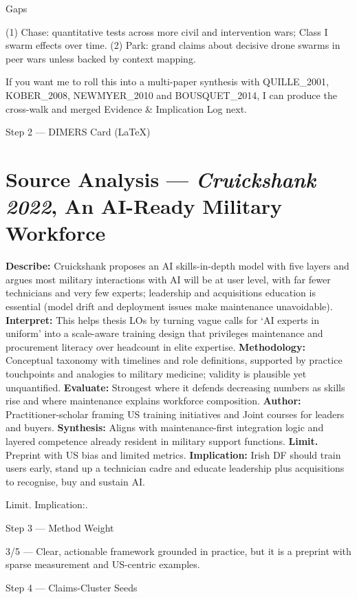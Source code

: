 Gaps

(1) Chase: quantitative tests across more civil and intervention wars; Class I swarm effects over time.
(2) Park: grand claims about decisive drone swarms in peer wars unless backed by context mapping.

If you want me to roll this into a multi-paper synthesis with QUILLE_2001, KOBER_2008, NEWMYER_2010 and BOUSQUET_2014, I can produce the cross-walk and merged Evidence & Implication Log next.

\parencite{CRUICKSHANK_2022}

Step 2 — DIMERS Card (LaTeX)

\section*{Source Analysis — \textit{Cruickshank 2022}, An AI-Ready Military Workforce}
\textbf{Describe:} Cruickshank proposes an AI skills-in-depth model with five layers and argues most military interactions with AI will be at user level, with far fewer technicians and very few experts; leadership and acquisitions education is essential (model drift and deployment issues make maintenance unavoidable).
\textbf{Interpret:} This helps thesis LOs by turning vague calls for ‘AI experts in uniform’ into a scale-aware training design that privileges maintenance and procurement literacy over headcount in elite expertise.
\textbf{Methodology:} Conceptual taxonomy with timelines and role definitions, supported by practice touchpoints and analogies to military medicine; validity is plausible yet unquantified.
\textbf{Evaluate:} Strongest where it defends decreasing numbers as skills rise and where maintenance explains workforce composition.
\textbf{Author:} Practitioner-scholar framing US training initiatives and Joint courses for leaders and buyers.
\textbf{Synthesis:} Aligns with maintenance-first integration logic and layered competence already resident in military support functions.
\textbf{Limit.} Preprint with US bias and limited metrics.
\textbf{Implication:} Irish DF should train users early, stand up a technician cadre and educate leadership plus acquisitions to recognise, buy and sustain AI.

Limit. Implication:.

Step 3 — Method Weight

3/5 — Clear, actionable framework grounded in practice, but it is a preprint with sparse measurement and US-centric examples.

Step 4 — Claims-Cluster Seeds

